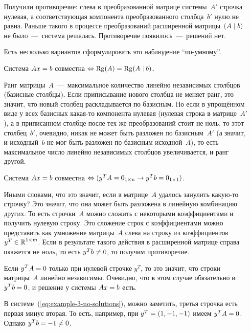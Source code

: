 \documentclass[a4paper,12pt]{article}
\begin{document}
  Получили противоречие: слева в преобразованной матрице системы~$A'$ строчка нулевая, а соответствующая компонента преобразованного столбца~$b'$ нулю не равна.
  Раньше такого в процессе преобразований расширенной матрицы~$(A \hm\mid b)$ не было~---~система решалась.
  Противоречие появилось~---~решений нет.

  Есть несколько вариантов сформулировать это наблюдение ``по-умному''.

  \begin{theorem}
    Система $Ax \hm= b$ совместна $\Leftrightarrow \Rg(A) \hm= \Rg(A \hm\mid b)$.
  \end{theorem}

  Ранг матрицы~$A$~---~максимальное количество линейно независимых столбцов (базисные столбцы).
  Если приписывание нового столбца не меняет ранг, это значит, что новый столбец раскладывается по базисным.
  Но если в упрощённом виде у всех базисных какая-то компонента нулевая (нулевая строка в матрице~$A'$), а в приписанном столбце после тех же преобразований стоит не ноль, то этот столбец~$b'$, очевидно, никак не может быть разложен по базисным~$A'$ (а значит, и исходный~$b$ не мог быть разложен по базисным исходной~$A$), то есть максимальное число линейно независимых столбцов увеличивается, и ранг другой.

  \begin{theorem}[Фредгольма]
    Система $Ax \hm= b$ совместна $\Leftrightarrow (y^T A \hm=0_{1\times n} \hm\rightarrow y^T b \hm= 0_{1\times 1})$.
  \end{theorem}

  Иными словами, что это значит, если в матрице~$A$ удалось занулить какую-то строчку?
  Это значит, что она может быть разложена в линейную комбинацию других.
  То есть строчки~$A$ можно сложить с некоторыми коэффициентами и получить нулевую строку.
  Это сложение строк с коэффициентами можно представить как умножение матрицы~$A$ слева на строку из коэффициентов $y^T \hm\in \RR^{1\times m}$.
  Если в результате такого действия в расширенной матрице справа окажется не ноль, то есть $y^T b \hm{\not=} 0$, то получим противоречие.

  \begin{example}
    Если $y^T A \hm= 0$ только при нулевой строчке $y^T$, то это значит, что строки матрицы~$A$ линейно независимы.
    Очевидно, что в этом случае обязательно и $y^T b \hm= 0$, и решение у системы $Ax \hm= b$ есть.

    В системе~(\ref{eq:example-3-no-solutions}), можно заметить, третья строчка есть первая минус вторая.
    То есть, например, при $y^T \hm= (1, -1, -1)$ имеем $y^T A \hm= 0$.
    Однако $y^T b \hm= -1 \hm{\not=} 0$.
  \end{example}
  
\end{document}
